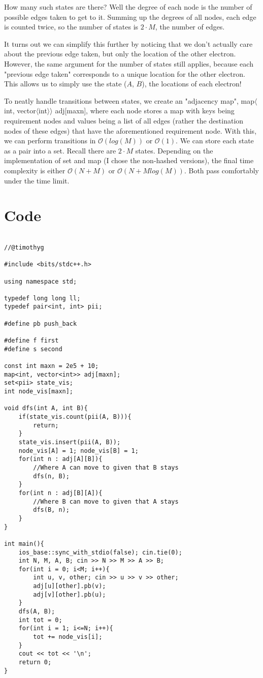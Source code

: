 \documentclass[15pt]{article}
\begin{document}
How many such states are there? Well the degree of each node is the number of possible edges taken to get to it. Summing up the degrees of all nodes, each edge is counted twice, so the number of states is $2 \cdot M$, the number of edges.

It turns out we can simplify this further by noticing that we don't actually care about the previous edge taken, but only the location of the other electron. However, the same argument for the number of states still applies, because each "previous edge taken" corresponds to a unique location for the other electron. This allows us to simply use the state ($A$, $B$), the locations of each electron!

To neatly handle transitions between states, we create an "adjacency map", map$\langle$int, vector$\langle$int$\rangle \rangle$ adj[maxn], where each node stores a map with keys being requirement nodes and values being a list of all edges (rather the destination nodes of these edges) that have the aforementioned requirement node. With this, we can perform transitions in $\mathcal{O}(log(M))$ or $\mathcal{O}(1)$. We can store each state as a pair into a set. Recall there are $2 \cdot M$ states. Depending on the implementation of set and map (I chose the non-hashed versions), the final time complexity is either $\mathcal{O}(N + M)$ or $\mathcal{O}(N + M log(M))$. Both pass comfortably under the time limit.

\section{Code}
\begin{lstlisting}

//@timothyg

#include <bits/stdc++.h>
 
using namespace std;
 
typedef long long ll;
typedef pair<int, int> pii;

#define pb push_back

#define f first
#define s second

const int maxn = 2e5 + 10;
map<int, vector<int>> adj[maxn];
set<pii> state_vis;
int node_vis[maxn];

void dfs(int A, int B){
    if(state_vis.count(pii(A, B))){
        return;
    }
    state_vis.insert(pii(A, B));
    node_vis[A] = 1; node_vis[B] = 1;
    for(int n : adj[A][B]){
        //Where A can move to given that B stays
        dfs(n, B);
    }
    for(int n : adj[B][A]){
        //Where B can move to given that A stays
        dfs(B, n);
    }
}

int main(){
    ios_base::sync_with_stdio(false); cin.tie(0);
    int N, M, A, B; cin >> N >> M >> A >> B;
    for(int i = 0; i<M; i++){
        int u, v, other; cin >> u >> v >> other;
        adj[u][other].pb(v);
        adj[v][other].pb(u);
    }
    dfs(A, B);
    int tot = 0;
    for(int i = 1; i<=N; i++){
        tot += node_vis[i];
    }
    cout << tot << '\n';
    return 0;
}

\end{lstlisting}
\end{document}
